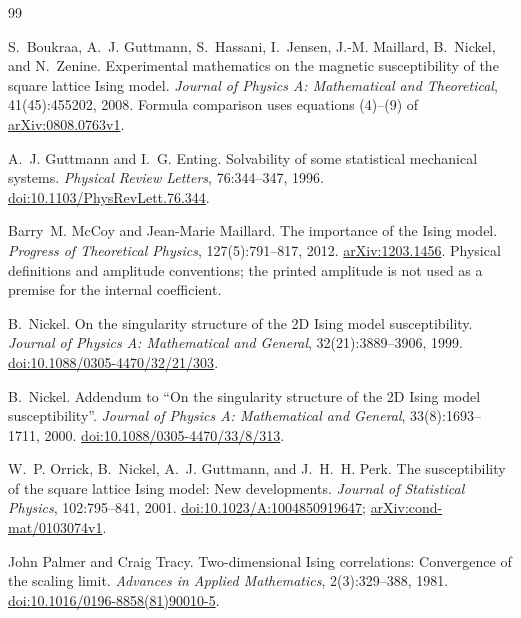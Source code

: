 \documentclass[11pt]{article}
\numberwithin{equation}{section}
\theoremstyle{definition}
\begin{document}
\begin{thebibliography}{99}

S.~Boukraa, A.~J. Guttmann, S.~Hassani, I.~Jensen, J.-M. Maillard,
B.~Nickel, and N.~Zenine.
\newblock Experimental mathematics on the magnetic susceptibility of the
square lattice {Ising} model.
\newblock \emph{Journal of Physics A: Mathematical and Theoretical},
41(45):455202, 2008.
\newblock Formula comparison uses equations (4)--(9) of
\href{https://arxiv.org/abs/0808.0763v1}{arXiv:0808.0763v1}.

A.~J. Guttmann and I.~G. Enting.
\newblock Solvability of some statistical mechanical systems.
\newblock \emph{Physical Review Letters}, 76:344--347, 1996.
\newblock \href{https://doi.org/10.1103/PhysRevLett.76.344}{doi:10.1103/PhysRevLett.76.344}.

Barry~M. McCoy and Jean-Marie Maillard.
\newblock The importance of the {Ising} model.
\newblock \emph{Progress of Theoretical Physics}, 127(5):791--817, 2012.
\newblock \href{https://arxiv.org/abs/1203.1456}{arXiv:1203.1456}.
Physical definitions and amplitude conventions; the printed amplitude
is not used as a premise for the internal coefficient.

B.~Nickel.
\newblock On the singularity structure of the 2D {Ising} model susceptibility.
\newblock \emph{Journal of Physics A: Mathematical and General},
32(21):3889--3906, 1999.
\newblock \href{https://doi.org/10.1088/0305-4470/32/21/303}{doi:10.1088/0305-4470/32/21/303}.

B.~Nickel.
\newblock Addendum to ``On the singularity structure of the 2D {Ising}
model susceptibility''.
\newblock \emph{Journal of Physics A: Mathematical and General},
33(8):1693--1711, 2000.
\newblock \href{https://doi.org/10.1088/0305-4470/33/8/313}{doi:10.1088/0305-4470/33/8/313}.

W.~P. Orrick, B.~Nickel, A.~J. Guttmann, and J.~H.~H. Perk.
\newblock The susceptibility of the square lattice {Ising} model:
New developments.
\newblock \emph{Journal of Statistical Physics}, 102:795--841, 2001.
\newblock \href{https://doi.org/10.1023/A:1004850919647}{doi:10.1023/A:1004850919647};
\href{https://arxiv.org/abs/cond-mat/0103074v1}{arXiv:cond-mat/0103074v1}.

John Palmer and Craig Tracy.
\newblock Two-dimensional {Ising} correlations: Convergence of the scaling limit.
\newblock \emph{Advances in Applied Mathematics}, 2(3):329--388, 1981.
\newblock \href{https://doi.org/10.1016/0196-8858(81)90010-5}{doi:10.1016/0196-8858(81)90010-5}.


\end{thebibliography}
\end{document}
